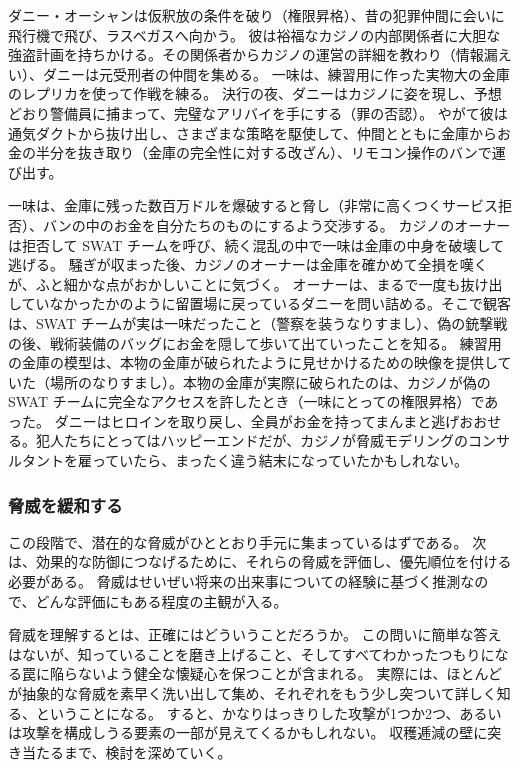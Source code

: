 \documentclass[uplatex]{jsarticle}
\def\label#1{}%
\begin{document}
\begin{exa}\label{exa:ch2-oceans-eleven}
ダニー・オーシャンは仮釈放の条件を破り（権限昇格）、昔の犯罪仲間に会いに飛行機で飛び、ラスベガスへ向かう。
彼は裕福なカジノの内部関係者に大胆な強盗計画を持ちかける。その関係者からカジノの運営の詳細を教わり（情報漏えい）、ダニーは元受刑者の仲間を集める。
一味は、練習用に作った実物大の金庫のレプリカを使って作戦を練る。
決行の夜、ダニーはカジノに姿を現し、予想どおり警備員に捕まって、完璧なアリバイを手にする（罪の否認）。
やがて彼は通気ダクトから抜け出し、さまざまな策略を駆使して、仲間とともに金庫からお金の半分を抜き取り（金庫の完全性に対する改ざん）、リモコン操作のバンで運び出す。

一味は、金庫に残った数百万ドルを爆破すると脅し（非常に高くつくサービス拒否）、バンの中のお金を自分たちのものにするよう交渉する。
カジノのオーナーは拒否して SWAT チームを呼び、続く混乱の中で一味は金庫の中身を破壊して逃げる。
騒ぎが収まった後、カジノのオーナーは金庫を確かめて全損を嘆くが、ふと細かな点がおかしいことに気づく。
オーナーは、まるで一度も抜け出していなかったかのように留置場に戻っているダニーを問い詰める。そこで観客は、SWAT チームが実は一味だったこと（警察を装うなりすまし）、偽の銃撃戦の後、戦術装備のバッグにお金を隠して歩いて出ていったことを知る。
練習用の金庫の模型は、本物の金庫が破られたように見せかけるための映像を提供していた（場所のなりすまし）。本物の金庫が実際に破られたのは、カジノが偽の SWAT チームに完全なアクセスを許したとき（一味にとっての権限昇格）であった。
ダニーはヒロインを取り戻し、全員がお金を持ってまんまと逃げおおせる。犯人たちにとってはハッピーエンドだが、カジノが脅威モデリングのコンサルタントを雇っていたら、まったく違う結末になっていたかもしれない。
\end{exa}

\subsubsection{脅威を緩和する}\label{subsec:ch2-mitigate-threats}

この段階で、潜在的な脅威がひととおり手元に集まっているはずである。
次は、効果的な防御につなげるために、それらの脅威を評価し、優先順位を付ける必要がある。
脅威はせいぜい将来の出来事についての経験に基づく推測なので、どんな評価にもある程度の主観が入る。

脅威を理解するとは、正確にはどういうことだろうか。
この問いに簡単な答えはないが、知っていることを磨き上げること、そしてすべてわかったつもりになる罠に陥らないよう健全な懐疑心を保つことが含まれる。
実際には、ほとんどが抽象的な脅威を素早く洗い出して集め、それぞれをもう少し突ついて詳しく知る、ということになる。
すると、かなりはっきりした攻撃が1つか2つ、あるいは攻撃を構成しうる要素の一部が見えてくるかもしれない。
収穫逓減の壁に突き当たるまで、検討を深めていく。
\end{document}

